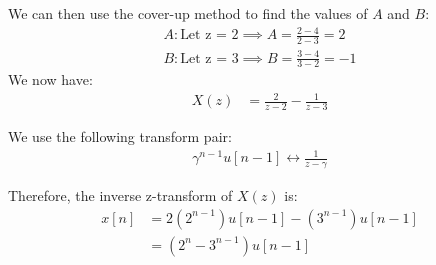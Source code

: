 \documentclass{article}
\begin{document}
\begin{enumerate}[label=P1.\arabic*]
\begin{enumerate}
        We can then use the cover-up method to find the values of $A$ and $B$:
        \begin{align*}
            A: \text{Let z = 2} \implies A = \frac{2-4}{2-3} = 2 \\
            B: \text{Let z = 3} \implies B = \frac{3-4}{3-2} = -1
        \end{align*}
        We now have:
        \begin{align*}
            X(z) &= \frac{2}{z-2} - \frac{1}{z-3}
        \end{align*}

        We use the following transform pair:
        \begin{align*}
            \gamma^{n-1} u[n-1] \longleftrightarrow \frac{1}{z-\gamma}
        \end{align*}

        Therefore, the inverse z-transform of $X(z)$ is:
        \begin{align*}
            x[n] &= 2(2^{n-1})u[n-1] - (3^{n-1})u[n-1] \\
            &= (2^{n} - 3^{n-1})u[n-1]
        \end{align*}
    \end{enumerate}
\end{enumerate}


\end{document}
